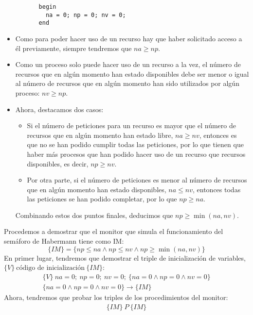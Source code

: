 \begin{ejercicio}
\begin{verbatim}
          begin
            na = 0; np = 0; nv = 0;
          end
    \end{verbatim}
    \begin{itemize}
        \item Como para poder hacer uso de un recurso hay que haber solicitado acceso a él previamente, siempre tendremos que $na \geq np$.
        \item Como un proceso solo puede hacer uso de un recurso a la vez, el número de recursos que en algún momento han estado disponibles debe ser menor o igual al número de recursos que en algún momento han sido utilizados por algún proceso: $nv \geq np$.
        \item Ahora, destacamos dos casos:
            \begin{itemize}
                \item Si el número de peticiones para un recurso es mayor que el número de recursos que en algún momento han estado libre, $na \geq nv$, entonces es que no se han podido cumplir todas las peticiones, por lo que tienen que haber más procesos que han podido hacer uso de un recurso que recursos disponibles, es decir, $np \geq nv$.
                \item Por otra parte, si el número de peticiones es menor al número de recursos que en algún momento han estado disponibles, $na \leq nv$, entonces todas las peticiones se han podido completar, por lo que $np \geq na$.
            \end{itemize}
            Combinando estos dos puntos finales, deducimos que $np \geq \min(na, nv)$.
    \end{itemize}
    Procedemos a demostrar que el monitor que simula el funcionamiento del semáforo de Habermann tiene como IM:
    \begin{equation*}
        \{IM\} = \{np \leq na \land np \leq nv \land np \geq \min(na,nv)\}
    \end{equation*}
    En primer lugar, tendremos que demostrar el triple de inicialización de variables, $\{V\}\ \text{código\ de\ inicialización}\ \{IM\}$:
    \begin{gather*}
        \{V\}\ na = 0;\ np=0;\ nv=0;\ \{na = 0 \land np = 0 \land nv = 0\} \\
        \{na = 0 \land np = 0 \land nv = 0\} \rightarrow \{IM\}
    \end{gather*}
    Ahora, tendremos que probar los triples de los procedimientos del monitor:
    \begin{gather*}
        \{IM\}\ P\ \{IM\} \\

\end{gather*}
\end{ejercicio}
